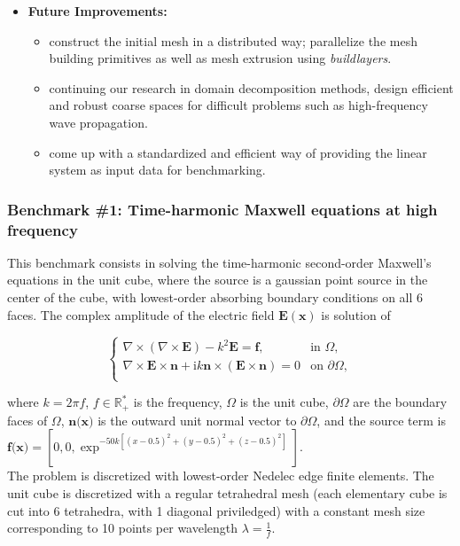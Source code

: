 \begin{itemize}
\begin{itemize}
        \end{itemize}
    \item \textbf{Future Improvements:}
        \begin{itemize}
        \item construct the initial mesh in a distributed way; parallelize the mesh building primitives as well as mesh extrusion using \textit{buildlayers}.
        \item continuing our research in domain decomposition methods, design efficient and robust coarse spaces for difficult problems such as high-frequency wave propagation.
        \item come up with a standardized and efficient way of providing the linear system as input data for benchmarking.
        \end{itemize}
\end{itemize}

\subsubsection{Benchmark \#1: Time-harmonic Maxwell equations at high frequency}

This benchmark consists in solving the time-harmonic second-order Maxwell's equations in the unit cube, where the source is a gaussian point source in the center of the cube, with lowest-order absorbing boundary conditions on all 6 faces. The complex amplitude of the electric field $\mathbf{E(x)}$ is solution of

\begin{equation}
  \begin{cases}
\nabla\times(\nabla\times \mathbf{E})- k^2 \mathbf{E} = \mathbf{f}, & \text{in } \Omega,\\
\nabla\times \mathbf{E}\times \textbf{n}+ \mathrm{i} k \textbf{n} \times (\mathbf{E}\times \textbf{n}) = 0 & \text{on } \partial\Omega,\\
  \end{cases}
\end{equation}

where $k = 2\pi f$, $f \in \mathbb{R}^*_+$ is the frequency, $\Omega$ is the unit cube, $\partial\Omega$ are the boundary faces of $\Omega$, $\textbf{n(x)}$ is the outward unit normal vector to $\partial\Omega$, and the source term is $\textbf{f(x)} = [0,0,\exp^{-50 k [(x-0.5)^2 + (y-0.5)^2 + (z-0.5)^2]}]$.\\
The problem is discretized with lowest-order Nedelec edge finite elements. The unit cube is discretized with a regular tetrahedral mesh (each elementary cube is cut into 6 tetrahedra, with 1 diagonal priviledged) with a constant mesh size corresponding to 10 points per wavelength $\lambda = \frac{1}{f}$.


